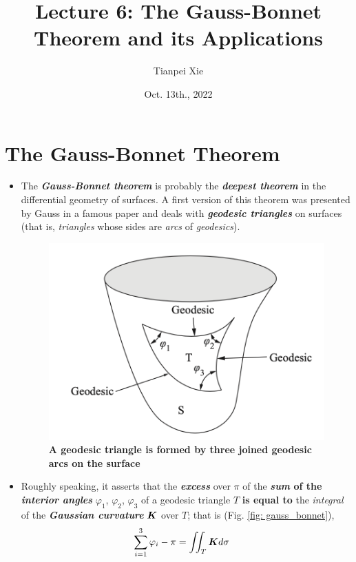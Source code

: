 \documentclass[11pt]{article}
\begin{document}
\title{Lecture 6: The Gauss-Bonnet Theorem and its Applications}
\author{ Tianpei Xie}
\date{Oct. 13th., 2022}
\maketitle
\tableofcontents
\newpage
\section{The Gauss-Bonnet Theorem}
\begin{itemize}
\item The \emph{\textbf{Gauss-Bonnet theorem}} is probably the \emph{\textbf{deepest theorem}} in the differential geometry of surfaces. A first version of this theorem was presented by Gauss in a famous paper and deals with \emph{\textbf{geodesic triangles}} on surfaces (that is, \emph{triangles} whose sides are \emph{arcs} of \emph{geodesics}). 

\begin{figure}[htb]
\centering
\begin{minipage}{1\linewidth}
 \centerline{\includegraphics[scale = 0.5]{geodesic_triangle.png}}
\end{minipage}
\caption{\scriptsize
\textbf{A geodesic triangle is formed by three joined geodesic arcs on the surface}}
\label{fig: geodesic_triangle}
\end{figure}


\item Roughly speaking, it asserts that the \emph{\textbf{excess}} over $\pi$ of the \textbf{\emph{sum} of the \emph{interior angles}} $\varphi_1$, $\varphi_2$, $\varphi_3$ of a geodesic triangle $T$ \textbf{is equal to} the \emph{integral} of the \emph{\textbf{Gaussian curvature}} $\boldsymbol{K}$ over $T$; that is (Fig. \ref{fig: gauss_bonnet}),
\begin{align*}
\sum_{i=1}^{3}\varphi_i - \pi &= \iint_{T} \boldsymbol{K} d\sigma
\end{align*}


\end{itemize}
\end{document}
